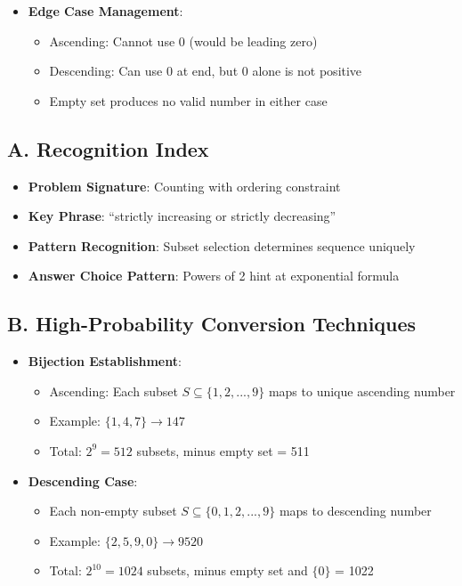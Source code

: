 \documentclass[]{article}
\begin{document}
\begin{tacticalbox}
\begin{itemize}[leftmargin=*]
    \item \textbf{Edge Case Management}:
    \begin{itemize}
        \item Ascending: Cannot use 0 (would be leading zero)
        \item Descending: Can use 0 at end, but 0 alone is not positive
        \item Empty set produces no valid number in either case
    \end{itemize}
\end{itemize}
\end{tacticalbox}

\begin{techniquesbox}
\subsection*{A. Recognition Index}
\begin{itemize}[leftmargin=*]
    \item \textbf{Problem Signature}: Counting with ordering constraint
    \item \textbf{Key Phrase}: ``strictly increasing or strictly decreasing''
    \item \textbf{Pattern Recognition}: Subset selection determines sequence uniquely
    \item \textbf{Answer Choice Pattern}: Powers of 2 hint at exponential formula
\end{itemize}

\subsection*{B. High-Probability Conversion Techniques}
\begin{itemize}[leftmargin=*]
    \item \textbf{Bijection Establishment}: 
    \begin{itemize}
        \item Ascending: Each subset $S \subseteq \{1,2,...,9\}$ maps to unique ascending number
        \item Example: $\{1,4,7\} \rightarrow 147$
        \item Total: $2^9 = 512$ subsets, minus empty set = 511
    \end{itemize}
    
    \item \textbf{Descending Case}: 
    \begin{itemize}
        \item Each non-empty subset $S \subseteq \{0,1,2,...,9\}$ maps to descending number
        \item Example: $\{2,5,9,0\} \rightarrow 9520$
        \item Total: $2^{10} = 1024$ subsets, minus empty set and $\{0\}$ = 1022
    \end{itemize}
\end{itemize}


\end{techniquesbox}
\end{document}
